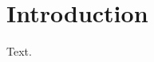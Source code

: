 \documentclass[12pt, a4paper, oneside, headinclude, footinclude, BCOR=5mm]{scrreprt}
\begin{document}
\tableofcontents
\chapter{Introduction}
Text.
\end{document}
